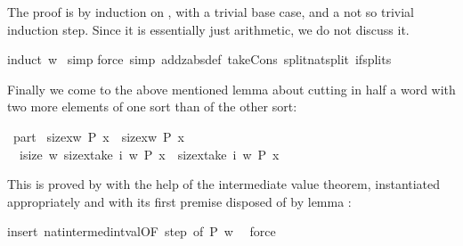\begin{isabellebody}
\begin{isamarkuptxt}
The proof is by induction on , with a trivial base case, and a not
so trivial induction step. Since it is essentially just arithmetic, we do not
discuss it.%
\end{isamarkuptxt}%
induct\ w{\isacharparenright}\isanewline
\ simp{\isacharparenright}\isanewline
{}force\ simp\ add{\isacharcolon}zabs{\isacharunderscore}def\ take{\isacharunderscore}Cons\ split{\isacharcolon}nat{\isachardot}split\ if{\isacharunderscore}splits{\isacharparenright}%
\begin{isamarkuptext}%
Finally we come to the above mentioned lemma about cutting in half a word with two
more elements of one sort than of the other sort:%
\end{isamarkuptext}%
\ part{}{\isacharcolon}\isanewline
\ {\isachardoublequote}size{\isacharbrackleft}x{\isasymin}w{\isachardot}\ P\ x{\isacharbrackright}\ {\isacharequal}\ size{\isacharbrackleft}x{\isasymin}w{\isachardot}\ {\isasymnot}P\ x{\isacharbrackright}{\isacharplus}{}\ {\isasymLongrightarrow}\isanewline
\ \ {\isasymexists}i{\isasymle}size\ w{\isachardot}\ size{\isacharbrackleft}x{\isasymin}take\ i\ w{\isachardot}\ P\ x{\isacharbrackright}\ {\isacharequal}\ size{\isacharbrackleft}x{\isasymin}take\ i\ w{\isachardot}\ {\isasymnot}P\ x{\isacharbrackright}{\isacharplus}{}{\isachardoublequote}%
\begin{isamarkuptxt}%
\noindent
This is proved by  with the help of the intermediate value theorem,
instantiated appropriately and with its first premise disposed of by lemma
:%
\end{isamarkuptxt}%
insert\ nat{}{\isacharunderscore}intermed{\isacharunderscore}int{\isacharunderscore}val{\isacharbrackleft}OF\ step{}{\isacharcomma}\ of\ {\isachardoublequote}P{\isachardoublequote}\ {\isachardoublequote}w{\isachardoublequote}\ {\isachardoublequote}{\isacharhash}{}{\isachardoublequote}{\isacharbrackright}{\isacharparenright}\isanewline
{}\ force%
\begin{isamarkuptext}%
\noindent


\end{isamarkuptext}
\end{isabellebody}
